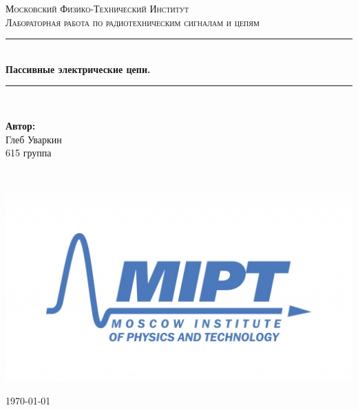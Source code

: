 \documentclass[a4paper, 12pt, twoside]{article}
\newenvironment{bottompar}{\par\vspace*{\fill}}{\clearpage}
\begin{document}
\begin{titlepage}

\newcommand{\HRule}{\rule{\linewidth}{0.7mm}} %

\center %
 

\textsc{\LARGE Московский Физико-Технический Институт}\\[1,5cm] %

\textsc{\large Лабораторная работа по радиотехническим сигналам и цепям}\\[0.5cm] %


\HRule
\\[0.4cm]
{ \huge \bfseries Пассивные электрические цепи.}
\\[0.4cm] %
\HRule
\\[1.5cm]


 


	\begin{center} \large
		\textbf{Автор:}\\
		Глеб Уваркин \\
		615 группа
	\end{center}

~


\begin{bottompar}
	\begin{center}
		\includegraphics[width = 80 mm]{logo.jpg}
	\end{center}
	{\large \today}

\end{bottompar}
\vfill %

\end{titlepage}
\end{document}
